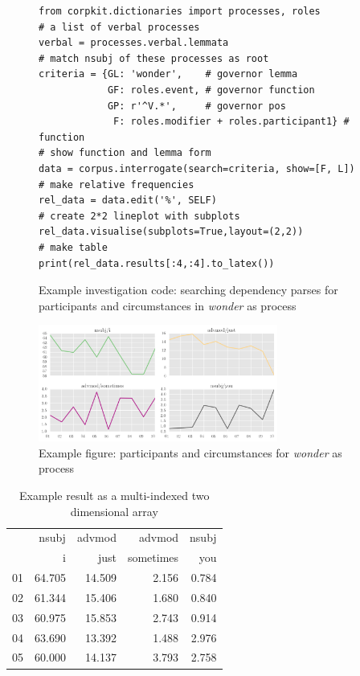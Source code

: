 \begin{figure}[H]
\begin{verbatim}
from corpkit.dictionaries import processes, roles
# a list of verbal processes
verbal = processes.verbal.lemmata
# match nsubj of these processes as root
criteria = {GL: 'wonder',    # governor lemma
            GF: roles.event, # governor function
            GP: r'^V.*',     # governor pos
             F: roles.modifier + roles.participant1} # function
# show function and lemma form
data = corpus.interrogate(search=criteria, show=[F, L])
# make relative frequencies
rel_data = data.edit('%', SELF)
# create 2*2 lineplot with subplots
rel_data.visualise(subplots=True,layout=(2,2))
# make table
print(rel_data.results[:4,:4].to_latex())
\end{verbatim}
\FloatBarrier
\caption[Example investigation code]{Example investigation code: searching dependency parses for participants and circumstances in \emph{wonder} as process}
\label{fig:wonder-code}
\end{figure}

\begin{figure}[H]
\centering
\includegraphics[width=0.70\textwidth]{../images/wonder-example.png}
\caption[Example figure]{Example figure: participants and circumstances for \emph{wonder} as process}
\label{fig:wonder_example_fig}
\end{figure}

\begin{table}[H]
\footnotesize
\begin{tabular}{lrrrr}

\toprule
{} &    nsubj &  advmod &  advmod &  nsubj \\
{} &    i &  just &  sometimes &  you \\
\midrule
01 &  64.705 &  14.509 &  2.156 &  0.784  \\
02 &  61.344 &  15.406 &  1.680 &  0.840  \\
03 &  60.975 &  15.853 &  2.743 &  0.914  \\
04 &  63.690 &  13.392 &  1.488 &  2.976  \\
05 &  60.000 &  14.137 &  3.793 &  2.758  \\
\bottomrule
\end{tabular}
\caption[Example result]{Example result as a multi\hyp{}indexed two dimensional array}
\end{table}

